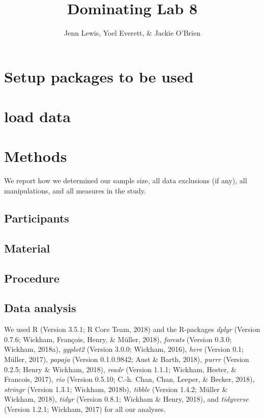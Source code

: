 \documentclass[man]{apa6}
\title{Dominating Lab 8}
\author{Jenn Lewis, Yoel Everett, \& Jackie O'Brien}
\date{}
\affiliation{
\vspace{0.5cm}
 School of R}
\begin{document}
\maketitle

\section{Setup packages to be used}\label{setup-packages-to-be-used}

\section{load data}\label{load-data}

\section{Methods}\label{methods}

We report how we determined our sample size, all data exclusions (if
any), all manipulations, and all measures in the study.

\subsection{Participants}\label{participants}

\subsection{Material}\label{material}

\subsection{Procedure}\label{procedure}

\subsection{Data analysis}\label{data-analysis}

We used R (Version 3.5.1; R Core Team, 2018) and the R-packages
\emph{dplyr} (Version 0.7.6; Wickham, François, Henry, \& Müller, 2018),
\emph{forcats} (Version 0.3.0; Wickham, 2018a), \emph{ggplot2} (Version
3.0.0; Wickham, 2016), \emph{here} (Version 0.1; Müller, 2017),
\emph{papaja} (Version 0.1.0.9842; Aust \& Barth, 2018), \emph{purrr}
(Version 0.2.5; Henry \& Wickham, 2018), \emph{readr} (Version 1.1.1;
Wickham, Hester, \& Francois, 2017), \emph{rio} (Version 0.5.10; C.-h.
Chan, Chan, Leeper, \& Becker, 2018), \emph{stringr} (Version 1.3.1;
Wickham, 2018b), \emph{tibble} (Version 1.4.2; Müller \& Wickham, 2018),
\emph{tidyr} (Version 0.8.1; Wickham \& Henry, 2018), and
\emph{tidyverse} (Version 1.2.1; Wickham, 2017) for all our analyses.
\end{document}
